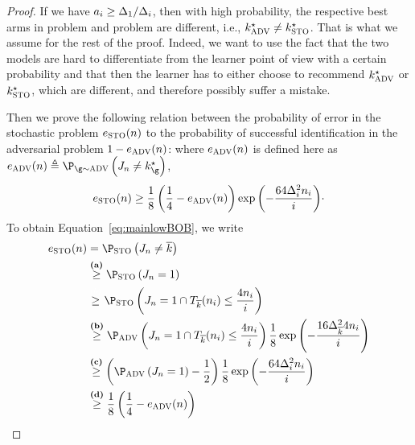 \begin{proof}
	
	If we have $a_i\geq \Delta_1 / \Delta_i$,  then with high probability, the respective best arms 
	in problem \stoPro{} and problem \advPro{}
	are %
	different, i.e., $k^\star_{\textsc{ADV}}\neq k^\star_{\textsc{STO}}$. That is what we assume for
	the rest of the proof. Indeed, we want to use the fact that 
	the two models are hard to differentiate from the learner point 
	of view with a certain probability and that then the learner has 
	to either choose to recommend $k^\star_{\textsc{ADV}}$ or $k^\star_{\textsc{STO}}$, which are different, and therefore possibly suffer a mistake.
	
	
	
	Then we prove the following relation between the probability of error 
	in the stochastic problem $e_{\textsc{STO}}(n)$ to the
	probability of successful identification in the adversarial problem
	$1-e_{\textsc{ADV}}(n)$:
	where $e_{\textsc{ADV}}(n)$ is defined here as 
	$\ProErr_{\advPro}(\timeHorizon) \triangleq \Pro_{\gainVector\sim\advPro}\left(\recomArm_n \neq \bestArm_{\gainVector}\right)$,
	\begin{equation}\label{eq:mainlowBOB}
	e_{\textsc{STO}}(n)
	\geq
	\frac{1}{8}\left(\frac{1}{4}-e_{\textsc{ADV}}(n) \right)\exp\left(-\frac{64\Delta^2_{i}n_i}{i}\right)\!\cdot
	\end{equation}
	To obtain Equation~\ref{eq:mainlowBOB}, we write
	\begin{align*}
	\ProErr_{\stoPro}(\timeHorizon)
	&=
	\Pro_{\stoPro}\left(\recomArm_\timeHorizon\neq \refarm\right)\\
	&\stackrel{\textbf{(a)}}{\geq}
	\Pro_{\stoPro}\left(\recomArm_\timeHorizon=1\right)\\
	&\stackrel{\textcolor{white}{(b)}}{\geq}
	\Pro_{\stoPro}\left(\recomArm_\timeHorizon=1 
	\cap \pullsNumber_{\refarm} (\timeHorizon_i) \leq  \frac{4\timeHorizon_i}{i}\right)\\
	&\stackrel{\textbf{(b)}}{\geq}
	\Pro_{\advPro}\left(\recomArm_\timeHorizon=1 
	\cap \pullsNumber_{\refarm} (\timeHorizon_i) 
	\leq  \frac{4\timeHorizon_i}{i}\right)\frac{1}{8}\exp\left(-\frac{16\gap^2_{\refarm}4\timeHorizon_i}{i}\right)\\
	&\stackrel{\textbf{(c)}}{\geq}
	\left(\Pro_{\advPro}\left(\recomArm_\timeHorizon=1 \right)
	-\frac{1}{2}\right)\frac{1}{8}\exp\left(-\frac{64\gap^2_{i}\timeHorizon_i}{i}\right)\\
	&\stackrel{\textbf{(d)}}{\geq}
	\frac{1}{8}\left(\frac{1}{4}-\ProErr_{\advPro}(\timeHorizon) \right)

\end{align*}
\end{proof}

